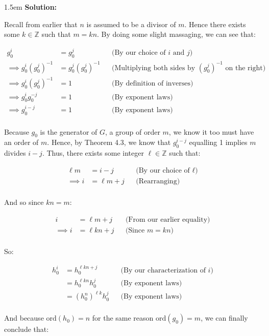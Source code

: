 \documentclass{article}
\newenvironment{solution}{
	\vspace{.5em}
	\par
	\begin{adjustwidth}{1.5em}{}
	\textbf{{Solution:}}
	\par
	\vspace{.5em}
}{
	\vspace{1em}
	\end{adjustwidth}
	\setcounter{step}{0}
	\newpage
}
\newcounter{step}
\newcommand{\ord}[1]{\text{ord}({#1})}
\begin{document}
\begin{solution}
	Recall from earlier that $n$ is assumed to be a divisor of $m$. Hence there exists some $k \in \mathbb{Z}$ such that $m = kn$. By doing some slight massaging, we can see that:

	\begin{align*}
		g_{0}^{i} &= g_{0}^{j} &&\text{(By our choice of $i$ and $j$)} \\
		\implies g_{0}^{i}(g_{0}^{j})^{-1} &= g_{0}^{j}(g_{0}^{j})^{-1} &&\text{(Multiplying both sides by $(g_{0}^{j})^{-1}$ on the right)} \\
		\implies g_{0}^{i}(g_{0}^{j})^{-1} &= 1 &&\text{(By definition of inverses)} \\
		\implies g_{0}^{i}g_{0}^{-j} &= 1 &&\text{(By exponent laws)} \\
		\implies g_{0}^{i-j} &= 1 &&\text{(By exponent laws)} \\
	\end{align*}

	Because $g_{0}$ is the generator of $G$, a group of order $m$, we know it too must have an order of $m$. Hence, by Theorem 4.3, we know that $g_{0}^{i-j}$ equalling 1 implies $m$ divides $i - j$. Thus, there exists some integer $\ell \in \mathbb{Z}$ such that:

	\begin{align*}
		\ell m &= i - j &&\text{(By our choice of $\ell$)} \\
		\implies i &= \ell m + j &&\text{(Rearranging)} \\
	\end{align*}

	And so since $kn = m$:

	\begin{align*}
		i &= \ell m + j &&\text{(From our earlier equality)} \\
		\implies i &= \ell kn + j &&\text{(Since $m = kn$)} \\
	\end{align*}

	So:

	\begin{align*}
		h_{0}^{i} &= h_{0}^{\ell kn + j} &&\text{(By our characterization of $i$)} \\
		&= h_{0}^{\ell kn}h_{0}^{j} &&\text{(By exponent laws)} \\
		&= (h_{0}^{n})^{\ell k}h_{0}^{j} &&\text{(By exponent laws)} \\
	\end{align*}

	And because $\ord{h_{0}} = n$ for the same reason $\ord{g_{0}} = m$, we can finally conclude that:


\end{solution}
\end{document}
